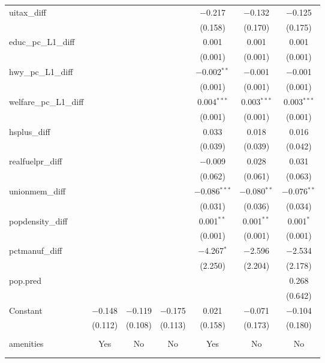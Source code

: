 \begin{table}[!htbp]
\begin{tabular}{@{\extracolsep{5pt}}lcccccc}
  uitax\_diff &  &  &  & $-$0.217 & $-$0.132 & $-$0.125 \\ 
  &  &  &  & (0.158) & (0.170) & (0.175) \\ 
  educ\_pc\_L1\_diff &  &  &  & 0.001 & 0.001 & 0.001 \\ 
  &  &  &  & (0.001) & (0.001) & (0.001) \\ 
  hwy\_pc\_L1\_diff &  &  &  & $-$0.002$^{**}$ & $-$0.001 & $-$0.001 \\ 
  &  &  &  & (0.001) & (0.001) & (0.001) \\ 
  welfare\_pc\_L1\_diff &  &  &  & 0.004$^{***}$ & 0.003$^{***}$ & 0.003$^{***}$ \\ 
  &  &  &  & (0.001) & (0.001) & (0.001) \\ 
  hsplus\_diff &  &  &  & 0.033 & 0.018 & 0.016 \\ 
  &  &  &  & (0.039) & (0.039) & (0.042) \\ 
  realfuelpr\_diff &  &  &  & $-$0.009 & 0.028 & 0.031 \\ 
  &  &  &  & (0.062) & (0.061) & (0.063) \\ 
  unionmem\_diff &  &  &  & $-$0.086$^{***}$ & $-$0.080$^{**}$ & $-$0.076$^{**}$ \\ 
  &  &  &  & (0.031) & (0.036) & (0.034) \\ 
  popdensity\_diff &  &  &  & 0.001$^{**}$ & 0.001$^{**}$ & 0.001$^{*}$ \\ 
  &  &  &  & (0.001) & (0.001) & (0.001) \\ 
  pctmanuf\_diff &  &  &  & $-$4.267$^{*}$ & $-$2.596 & $-$2.534 \\ 
  &  &  &  & (2.250) & (2.204) & (2.178) \\ 
  pop.pred &  &  &  &  &  & 0.268 \\ 
  &  &  &  &  &  & (0.642) \\ 
  Constant & $-$0.148 & $-$0.119 & $-$0.175 & 0.021 & $-$0.071 & $-$0.104 \\ 
  & (0.112) & (0.108) & (0.113) & (0.158) & (0.173) & (0.180) \\ 
 \hline \\[-1.8ex] 
amenities & Yes & No & No & Yes & No & No \\ 
\hline \\[-1.8ex] 
\hline 
\hline \\[-1.8ex] 
\end{tabular} 
\end{table} 

